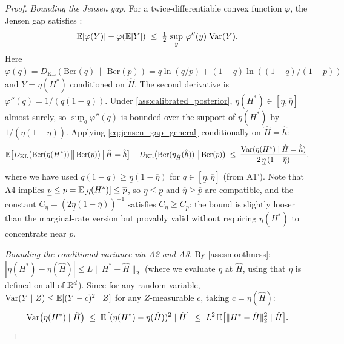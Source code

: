 \begin{proof}
\emph{Bounding the Jensen gap.}
For a twice-differentiable convex function $\varphi$, the Jensen gap satisfies \citep[Prop.~1]{liao2019sharpening}:
\begin{equation}
\label{eq:jensen_gap_general}
\mathbb{E}[\varphi(Y)] - \varphi(\mathbb{E}[Y]) \;\leq\; \tfrac{1}{2}\,\sup_{y}\,\varphi''(y)\;\mathrm{Var}(Y).
\end{equation}
Here $\varphi(q) = D_{\mathrm{KL}}(\mathrm{Ber}(q)\,\|\,\mathrm{Ber}(p)) = q\ln(q/p) + (1{-}q)\ln((1{-}q)/(1{-}p))$ and $Y = \eta(H^*)$ conditioned on $\hat{H}$.
The second derivative is $\varphi''(q) = 1/(q(1{-}q))$.
Under \ref{ass:calibrated_posterior}, $\eta(H^*) \in [\underline{\eta}, \overline{\eta}]$ almost surely, so $\sup_q \varphi''(q)$ is bounded over the support of $\eta(H^*)$ by $1/(\underline{\eta}(1{-}\overline{\eta}))$.
Applying \eqref{eq:jensen_gap_general} conditionally on $\hat{H} = \hat{h}$:
\begin{equation}
\label{eq:jensen_gap_conditional}
\mathbb{E}\bigl[D_{\mathrm{KL}}\bigl(\mathrm{Ber}(\eta(H^*))\,\big\|\,\mathrm{Ber}(p)\bigr) \,\big|\, \hat{H}=\hat{h}\bigr]
- D_{\mathrm{KL}}\bigl(\mathrm{Ber}(\eta_{\hat{H}}(\hat{h}))\,\big\|\,\mathrm{Ber}(p)\bigr)
\;\leq\;
\frac{\mathrm{Var}(\eta(H^*) \mid \hat{H}=\hat{h})}{2\,\underline{\eta}\,(1-\overline{\eta})},
\end{equation}
where we have used $q(1-q) \geq \underline{\eta}(1-\overline{\eta})$ for $q \in [\underline{\eta}, \overline{\eta}]$ (from A1').
Note that A4 implies $\underline{p} \leq p = \mathbb{E}[\eta(H^*)] \leq \overline{p}$, so $\underline{\eta} \leq \underline{p}$ and $\overline{\eta} \geq \overline{p}$ are compatible, and the constant $C_\eta = (2\underline{\eta}(1-\overline{\eta}))^{-1}$ satisfies $C_\eta \geq C_p$: the bound is slightly looser than the marginal-rate version but provably valid without requiring $\eta(H^*)$ to concentrate near $p$.

\emph{Bounding the conditional variance via A2 and A3.}
By \ref{ass:smoothness}: $|\eta(H^*) - \eta(\hat{H})| \leq L\|H^* - \hat{H}\|_2$ (where we evaluate $\eta$ at $\hat{H}$, using that $\eta$ is defined on all of $\mathbb{R}^d$).
Since for any random variable, $\mathrm{Var}(Y \mid Z) \leq \mathbb{E}[(Y - c)^2 \mid Z]$ for any $Z$-measurable $c$, taking $c = \eta(\hat{H})$:
\begin{equation}
\label{eq:var_bound}
\mathrm{Var}\bigl(\eta(H^*) \mid \hat{H}\bigr) \;\leq\; \mathbb{E}\bigl[(\eta(H^*) - \eta(\hat{H}))^2 \mid \hat{H}\bigr] \;\leq\; L^2\,\mathbb{E}\bigl[\|H^* - \hat{H}\|_2^2 \mid \hat{H}\bigr].
\end{equation}


\end{proof}
